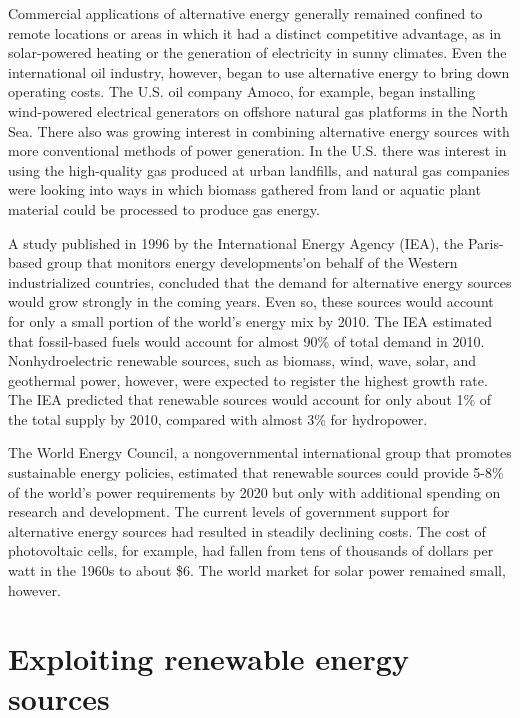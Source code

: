 \documentclass[a4paper]{article}
\begin{document}
Commercial applications of alternative energy generally remained confined to remote locations or areas
in which it had a distinct competitive advantage, as in solar-powered heating or the generation of
electricity in sunny climates. Even the international oil industry, however, began to use
alternative energy to bring down operating costs. The U.S. oil company Amoco, for example,
began installing wind-powered electrical generators on offshore natural gas platforms in the North Sea.
There also was growing interest in combining alternative energy sources with more conventional methods
of power generation. In the U.S. there was interest in using the high-quality gas produced at urban
landfills, and natural gas companies were looking into ways in which biomass gathered from land or
aquatic plant material could be processed to produce gas energy.

A study published in 1996 by the International Energy Agency (IEA), the Paris-based group that monitors
energy developments'on behalf of the Western industrialized countries, concluded that the demand for
alternative energy sources would grow strongly in the coming years. Even so, these sources would
account for only a small portion of the world's energy mix by 2010. The IEA estimated that
fossil-based fuels would account for almost 90\% of total demand in 2010. Nonhydroelectric
renewable sources, such as biomass, wind, wave, solar, and geothermal power, however, were expected
to register the highest growth rate. The IEA predicted that renewable sources would account for only
about 1\% of the total supply by 2010, compared with almost 3\% for hydropower.

The World Energy Council, a nongovernmental international group that promotes sustainable energy
policies, estimated that renewable sources could provide 5-8\% of the world's power requirements
by 2020 but only with additional spending on research and development. The current levels of government
support for alternative energy sources had resulted in steadily declining costs. The cost of
photovoltaic cells, for example, had fallen from tens of thousands of dollars per watt in the
1960s to about \$6. The world market for solar power remained small, however.

\section{Exploiting renewable energy sources}
\end{document}
